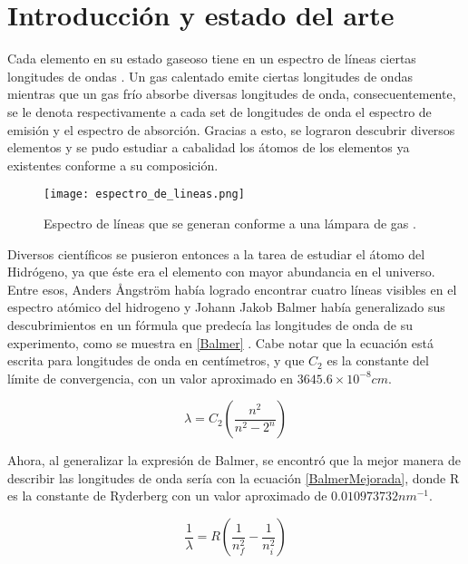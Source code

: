 \documentclass[%
 reprint,
 amsmath,amssymb,
 aps,
]{revtex4-1}
\begin{document}

\section{\label{sec:introduccion} Introducción y estado del arte}

Cada elemento en su estado gaseoso tiene en un espectro de líneas ciertas longitudes de ondas \cite{fisicauniversitaria}. Un gas calentado emite ciertas longitudes de ondas mientras que un gas frío absorbe diversas longitudes de onda, consecuentemente, se le denota respectivamente a cada set de longitudes de onda el espectro de emisión y el espectro de absorción. Gracias a esto, se lograron descubrir diversos elementos y se pudo estudiar a cabalidad los átomos de los elementos ya existentes conforme a su composición. 

\begin{figure}[H]
    \centering
    \texttt{[image: espectro\_de\_lineas.png]}
    \caption{Espectro de líneas que se generan conforme a una lámpara de gas \cite{fisicauniversitaria}.}
    \label{fig:espectro}
\end{figure}


Diversos científicos se pusieron entonces a la tarea de estudiar el átomo del Hidrógeno, ya que éste era el elemento con mayor abundancia en el universo. Entre esos, Anders Ångström había logrado encontrar cuatro líneas visibles en el espectro atómico del hidrogeno y Johann Jakob Balmer había generalizado sus descubrimientos en un fórmula que predecía las longitudes de onda de su experimento, como se muestra en \eqref{Balmer} \cite{serway2004modern}. Cabe notar que la ecuación está escrita para longitudes de onda en centímetros, y que $C_2$ es la constante del límite de convergencia, con un valor aproximado en $3645.6 \times 10^{-8} cm$.

\begin{equation} \label{Balmer}
   \lambda = C_2 \left(\frac{n^2}{n^2-2^n}\right)
\end{equation}

Ahora, al generalizar la expresión de Balmer, se encontró que la mejor manera de describir las longitudes de onda sería con la ecuación \eqref{BalmerMejorada}, donde R es la constante de Ryderberg con un valor aproximado de $0.010973732 nm^{-1}$.

\begin{equation} \label{BalmerMejorada}
   \frac{1}{\lambda} = R \left(\frac{1}{n_f^2} - \frac{1}{n_i^2} \right)
\end{equation}
\end{document}
